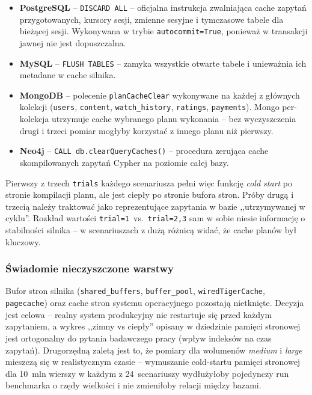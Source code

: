 \begin{itemize}
    \item \textbf{PostgreSQL} -- \texttt{DISCARD ALL} -- oficjalna
    instrukcja zwalniająca cache zapytań przygotowanych, kursory
    sesji, zmienne sesyjne i tymczasowe tabele dla bieżącej sesji.
    Wykonywana w trybie \texttt{autocommit=True}, ponieważ w
    transakcji jawnej nie jest dopuszczalna.
    \item \textbf{MySQL} -- \texttt{FLUSH TABLES} -- zamyka wszystkie
    otwarte tabele i unieważnia ich metadane w cache silnika.
    \item \textbf{MongoDB} -- polecenie \texttt{planCacheClear}
    wykonywane na każdej z głównych kolekcji
    (\texttt{users}, \texttt{content}, \texttt{watch\_history},
    \texttt{ratings}, \texttt{payments}). Mongo per-kolekcja
    utrzymuje cache wybranego planu wykonania -- bez wyczyszczenia
    drugi i trzeci pomiar mogłyby korzystać z innego planu niż pierwszy.
    \item \textbf{Neo4j} -- \texttt{CALL db.clearQueryCaches()} -- procedura
    zerująca cache skompilowanych zapytań Cypher na poziomie całej bazy.
\end{itemize}

\noindent Pierwszy z trzech \texttt{trials} każdego scenariusza pełni
więc funkcję \emph{cold start} po stronie kompilacji planu, ale jest
ciepły po stronie bufora stron. Próby drugą i trzecią należy traktować
jako reprezentujące zapytania w bazie ,,utrzymywanej w cyklu''.
Rozkład wartości \texttt{trial=1}~vs.~\texttt{trial=2,3} sam w sobie
niesie informację o stabilności silnika -- w scenariuszach z dużą
różnicą widać, że cache planów był kluczowy.

\subsubsection*{Świadomie nieczyszczone warstwy}

Bufor stron silnika (\texttt{shared\_buffers}, \texttt{buffer\_pool},
\texttt{wiredTigerCache}, \texttt{pagecache}) oraz cache stron systemu
operacyjnego pozostają nietknięte. Decyzja jest celowa -- realny system
produkcyjny nie restartuje się przed każdym zapytaniem, a wykres
,,zimny vs ciepły'' opisany w dziedzinie pamięci stronowej jest
ortogonalny do pytania badawczego pracy (wpływ indeksów na czas
zapytań). Drugorzędną zaletą jest to, że pomiary dla wolumenów
\emph{medium} i \emph{large} mieszczą się w realistycznym czasie --
wymuszanie cold-startu pamięci stronowej dla 10~mln wierszy w
każdym z 24~scenariuszy wydłużyłoby pojedynczy run benchmarka o
rzędy wielkości i nie zmieniłoby relacji między bazami.

